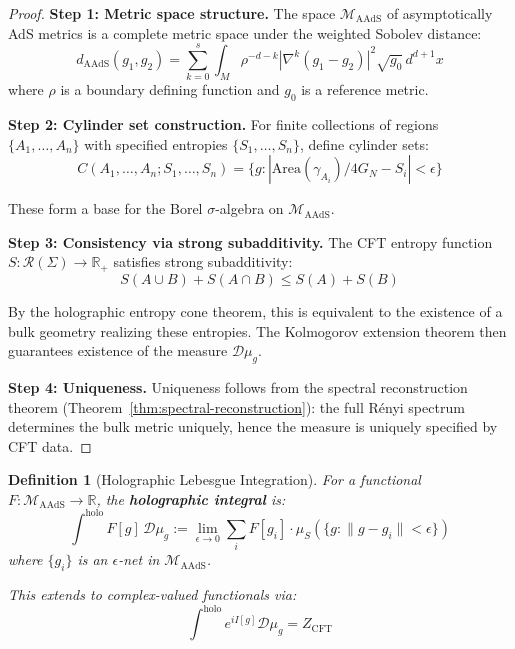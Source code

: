 \documentclass[12pt,a4paper]{article}
\newtheorem{definition}[theorem]{Definition}
\begin{document}
\begin{proof}
\textbf{Step 1: Metric space structure.}
The space $\mathcal{M}_{\text{AAdS}}$ of asymptotically AdS metrics is a complete metric space under the weighted Sobolev distance:
\begin{equation}
d_{\text{AAdS}}(g_1, g_2) = \sum_{k=0}^{s} \int_M \rho^{-d-k} |\nabla^k(g_1 - g_2)|^2 \sqrt{g_0} \, d^{d+1}x
\end{equation}
where $\rho$ is a boundary defining function and $g_0$ is a reference metric.

\textbf{Step 2: Cylinder set construction.}
For finite collections of regions $\{A_1, \ldots, A_n\}$ with specified entropies $\{S_1, \ldots, S_n\}$, define cylinder sets:
\begin{equation}
C(A_1, \ldots, A_n; S_1, \ldots, S_n) = \{g : |\text{Area}(\gamma_{A_i})/4G_N - S_i| < \epsilon \}
\end{equation}

These form a base for the Borel $\sigma$-algebra on $\mathcal{M}_{\text{AAdS}}$.

\textbf{Step 3: Consistency via strong subadditivity.}
The CFT entropy function $S: \mathcal{R}(\Sigma) \to \mathbb{R}_+$ satisfies strong subadditivity:
\begin{equation}
S(A \cup B) + S(A \cap B) \leq S(A) + S(B)
\end{equation}

By the holographic entropy cone theorem, this is equivalent to the existence of a bulk geometry realizing these entropies. The Kolmogorov extension theorem then guarantees existence of the measure $\mathcal{D}\mu_g$.

\textbf{Step 4: Uniqueness.}
Uniqueness follows from the spectral reconstruction theorem (Theorem~\ref{thm:spectral-reconstruction}): the full R\'enyi spectrum determines the bulk metric uniquely, hence the measure is uniquely specified by CFT data.
\end{proof}

\begin{definition}[Holographic Lebesgue Integration]\label{def:holo-lebesgue}
For a functional $F: \mathcal{M}_{\text{AAdS}} \to \mathbb{R}$, the \textbf{holographic integral} is:
\begin{equation}
\int^{\text{holo}} F[g] \, \mathcal{D}\mu_g := \lim_{\epsilon \to 0} \sum_{i} F[g_i] \cdot \mu_S(\{g : \|g - g_i\| < \epsilon\})
\end{equation}
where $\{g_i\}$ is an $\epsilon$-net in $\mathcal{M}_{\text{AAdS}}$.

This extends to complex-valued functionals via:
\begin{equation}
\int^{\text{holo}} e^{iI[g]} \mathcal{D}\mu_g = Z_{\text{CFT}}
\end{equation}
\end{definition}
\end{document}
